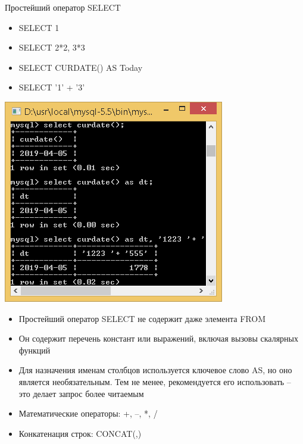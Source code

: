 \documentclass{beamer}
\begin{document}
\begin{frame}{Простейший оператор SELECT}
\begin{minipage}{0.3\textwidth}
  \begin{flushleft}
  	\begin{itemize}
  	\item SELECT 1
	\item SELECT 2*2, 3*3
	\item SELECT CURDATE() AS Today
	\item SELECT '1' + '3'
  	\end{itemize}
	\begin{center}
		\includegraphics[scale=0.2]{images/SQL-01.png}
	\end{center}
  \end{flushleft}
\end{minipage}
\begin{minipage}{0.6\textwidth}
  \begin{flushright}
	\begin{itemize}
		\item Простейший оператор SELECT не
содержит даже элемента FROM
\item Он содержит перечень констант
или выражений, включая вызовы
скалярных функций
\item Для назначения именам столбцов
используется ключевое слово AS,
но оно является необязательным.
Тем не менее, рекомендуется его
использовать – это делает запрос
более читаемым
\item Математические операторы: +, –, *, / 
\item Конкатенация строк: CONCAT(,)
\end{itemize}
  \end{flushright}
\end{minipage}
\end{frame}
\end{document}
